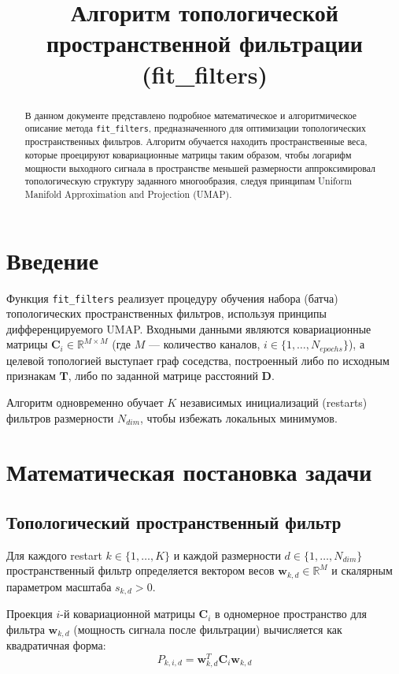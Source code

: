 \documentclass[a4paper,12pt]{article}
\title{Алгоритм топологической пространственной фильтрации (fit\_filters)}
\author{}
\date{}
\begin{document}
\maketitle

\begin{abstract}
В данном документе представлено подробное математическое и алгоритмическое описание метода \texttt{fit\_filters}, предназначенного для оптимизации топологических пространственных фильтров. Алгоритм обучается находить пространственные веса, которые проецируют ковариационные матрицы таким образом, чтобы логарифм мощности выходного сигнала в пространстве меньшей размерности аппроксимировал топологическую структуру заданного многообразия, следуя принципам Uniform Manifold Approximation and Projection (UMAP).
\end{abstract}

\section{Введение}
Функция \texttt{fit\_filters} реализует процедуру обучения набора (батча) топологических пространственных фильтров, используя принципы дифференцируемого UMAP.
Входными данными являются ковариационные матрицы $\mathbf{C}_i \in \mathbb{R}^{M \times M}$ (где $M$ --- количество каналов, $i \in \{1, \dots, N_{epochs}\}$), а целевой топологией выступает граф соседства, построенный либо по исходным признакам $\mathbf{T}$, либо по заданной матрице расстояний $\mathbf{D}$.

Алгоритм одновременно обучает $K$ независимых инициализаций (restarts) фильтров размерности $N_{dim}$, чтобы избежать локальных минимумов.

\section{Математическая постановка задачи}

\subsection{Топологический пространственный фильтр}
Для каждого restart $k \in \{1, \dots, K\}$ и каждой размерности $d \in \{1, \dots, N_{dim}\}$ пространственный фильтр определяется вектором весов $\mathbf{w}_{k,d} \in \mathbb{R}^{M}$ и скалярным параметром масштаба $s_{k,d} > 0$.

Проекция $i$-й ковариационной матрицы $\mathbf{C}_i$ в одномерное пространство для фильтра $\mathbf{w}_{k,d}$ (мощность сигнала после фильтрации) вычисляется как квадратичная форма:
\begin{equation}
    P_{k,i,d} = \mathbf{w}_{k,d}^T \mathbf{C}_i \mathbf{w}_{k,d}
\end{equation}
\end{document}
